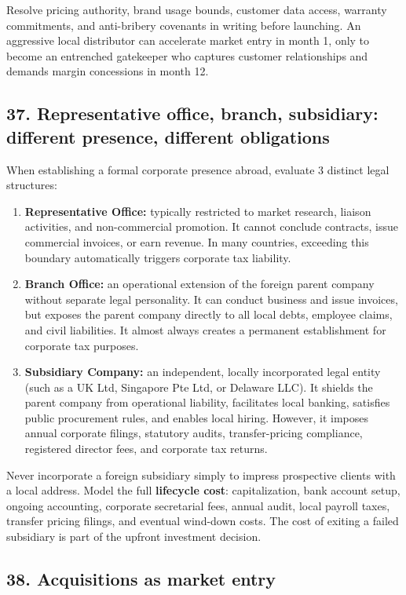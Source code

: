 Resolve pricing authority, brand usage bounds, customer data access, warranty commitments, and anti-bribery covenants in writing before launching. An aggressive local distributor can accelerate market entry in month 1, only to become an entrenched gatekeeper who captures customer relationships and demands margin concessions in month 12.

\subsection{37. Representative office, branch, subsidiary: different presence, different obligations}

When establishing a formal corporate presence abroad, evaluate 3 distinct legal structures:
\begin{enumerate}
    \item \textbf{Representative Office:} typically restricted to market research, liaison activities, and non-commercial promotion. It cannot conclude contracts, issue commercial invoices, or earn revenue. In many countries, exceeding this boundary automatically triggers corporate tax liability.
    \item \textbf{Branch Office:} an operational extension of the foreign parent company without separate legal personality. It can conduct business and issue invoices, but exposes the parent company directly to all local debts, employee claims, and civil liabilities. It almost always creates a permanent establishment for corporate tax purposes.
    \item \textbf{Subsidiary Company:} an independent, locally incorporated legal entity (such as a UK Ltd, Singapore Pte Ltd, or Delaware LLC). It shields the parent company from operational liability, facilitates local banking, satisfies public procurement rules, and enables local hiring. However, it imposes annual corporate filings, statutory audits, transfer-pricing compliance, registered director fees, and corporate tax returns.
\end{enumerate}

Never incorporate a foreign subsidiary simply to impress prospective clients with a local address. Model the full \textbf{lifecycle cost}: capitalization, bank account setup, ongoing accounting, corporate secretarial fees, annual audit, local payroll taxes, transfer pricing filings, and eventual wind-down costs. The cost of exiting a failed subsidiary is part of the upfront investment decision.

\subsection{38. Acquisitions as market entry}

